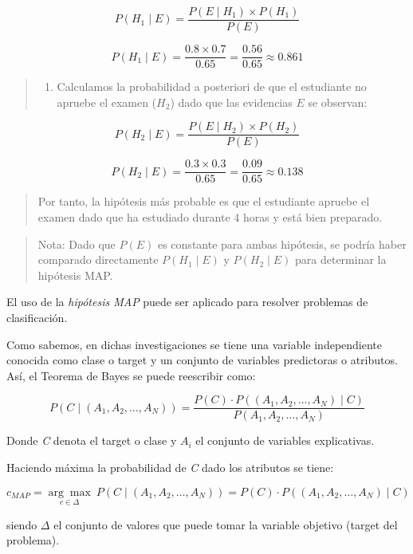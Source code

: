 \documentclass[
  a4paper,
  DIV=11,
  numbers=noendperiod]{scrreprt}
\providecommand{\tightlist}{%
  \setlength{\itemsep}{0pt}\setlength{\parskip}{0pt}}\usepackage{longtable,booktabs,array}
\begin{document}
\[
P(H_1 \mid E) = \frac{P(E \mid H_1) \times P(H_1)}{P(E)}
\]

\[
P(H_1 \mid E) = \frac{0.8 \times 0.7}{0.65} = \frac{0.56}{0.65} \approx 0.861
\]

\begin{quote}
\begin{enumerate}
\def\labelenumi{\arabic{enumi}.}
\setcounter{enumi}{2}
\tightlist
\item
  Calculamos la probabilidad a posteriori de que el estudiante no
  apruebe el examen (\(H_2\)) dado que las evidencias \(E\) se observan:
\end{enumerate}
\end{quote}

\[
P(H_2 \mid E) = \frac{P(E \mid H_2) \times P(H_2)}{P(E)}
\]

\[
P(H_2 \mid E) = \frac{0.3 \times 0.3}{0.65} = \frac{0.09}{0.65} \approx 0.138
\]

\begin{quote}
Por tanto, la hipótesis más probable es que el estudiante apruebe el
examen dado que ha estudiado durante 4 horas y está bien preparado.
\end{quote}

\begin{quote}
Nota: Dado que \(P(E)\) es constante para ambas hipótesis, se podría
haber comparado directamente \(P(H_1 \mid E)\) y \(P(H_2 \mid E)\) para
determinar la hipótesis MAP.
\end{quote}

El uso de la \emph{hipótesis MAP} puede ser aplicado para resolver
problemas de clasificación.

Como sabemos, en dichas investigaciones se tiene una variable
independiente conocida como clase o target y un conjunto de variables
predictoras o atributos. Así, el Teorema de Bayes se puede reescribir
como:

\[
P(C \mid (A_1, A_2, \ldots, A_N)) = \frac{P(C) \cdot P((A_1, A_2, \ldots, A_N) \mid C)}{P(A_1, A_2, \ldots, A_N)}
\]

Donde \emph{C} denota el target o clase y \(A_i\) el conjunto de
variables explicativas.

Haciendo máxima la probabilidad de \emph{C} dado los atributos se tiene:

\[
c_{MAP} = \underset{c \in \Delta}{\arg\max} \ P(C \mid (A_1, A_2, \ldots, A_N)) = P(C) \cdot P((A_1, A_2, \ldots, A_N) \mid C)
\]

siendo \(\Delta\) el conjunto de valores que puede tomar la variable
objetivo (target del problema).
\end{document}
